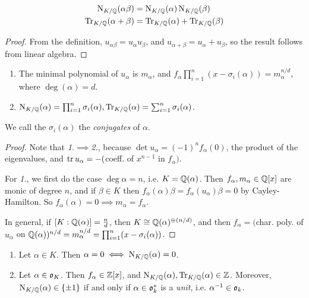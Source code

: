 \documentclass[10pt,a4paper]{article}
\begin{document}
\begin{proposition}
\begin{align*}
\operatorname{N}_{K/\mathbb{Q}}(\alpha\beta) &= \operatorname{N}_{K/\mathbb{Q}}(\alpha)\operatorname{N}_{K/\mathbb{Q}}(\beta)\\
\operatorname{Tr}_{K/\mathbb{Q}}(\alpha+\beta) &= \operatorname{Tr}_{K/\mathbb{Q}}(\alpha) + \operatorname{Tr}_{K/\mathbb{Q}}(\beta)
\end{align*}
\end{proposition}
\begin{proof}
From the definition, $u_{\alpha\beta} = u_{\alpha}u_{\beta}$, and $u_{\alpha+\beta} = u_{\alpha} + u_{\beta}$, so the result follows from linear algebra.
\end{proof}

\begin{theorem}
\item
\begin{enumerate}
\item The minimal polynomial of $u_{\alpha}$ is $m_{\alpha}$, and $f_{\alpha} \prod_{i=1}^n(x-\sigma_i(\alpha)) = m_{\alpha}^{n/d}$, where $\deg(\alpha) = d$.

\item $\operatorname{N}_{K/\mathbb{Q}}(\alpha) = \prod_{i=1}^n \sigma_i(\alpha), \operatorname{Tr}_{K/\mathbb{Q}}(\alpha) = \sum_{i=1}^n \sigma_i(\alpha)$.
\end{enumerate}
We call the $\sigma_i(\alpha)$ the \emph{conjugates} of $\alpha$.
\end{theorem}
\begin{proof}
Note that \textit{1.}$\implies$\textit{2.}, because $\det u_{\alpha} = (-1)^n f_{\alpha}(0)$, the product of the eigenvalues, and $\operatorname{tr} u_{\alpha} = -($coeff. of $ x^{n-1}$ in $f_\alpha)$.

For \textit{1.}, we first do the case $\deg \alpha = n$, i.e. $K = \mathbb{Q}(\alpha)$. Then $f_\alpha, m_\alpha \in \mathbb{Q}[x]$ are monic of degree $n$, and if $\beta \in K$ then $f_{\alpha}(\alpha)\beta = f_{\alpha}(u_{\alpha})\beta = 0$ by Cayley-Hamilton. So $f_\alpha(\alpha) = 0 \implies m_\alpha = f_\alpha$.

In general, if $[K:\mathbb{Q}(\alpha)] = \frac{n}{d}$, then $K \cong \mathbb{Q}(\alpha)^{\oplus(n/d)}$, and then $f_\alpha = ($char. poly. of $u_\alpha$ on $\mathbb{Q}(\alpha))^{n/d} = m_\alpha^{n/d} = \prod_{i=1}^n (x-\sigma_i(\alpha))$.
\end{proof}
\begin{corollary}
\item
\begin{enumerate}
\item Let $\alpha \in K$. Then $\alpha = 0 \iff \operatorname{N}_{K/\mathbb{Q}}(\alpha) = 0$.
\item Let $\alpha \in \mathfrak{o}_K$. Then $f_{\alpha} \in \mathbb{Z}[x]$, and $\operatorname{N}_{K/\mathbb{Q}}(\alpha), \operatorname{Tr}_{K/\mathbb{Q}}(\alpha) \in \mathbb{Z}$. Moreover, $\operatorname{N}_{K/\mathbb{Q}}(\alpha) \in \{\pm 1\}$ if and only if $\alpha \in \mathfrak{o}_k^{\ast}$ is a \emph{unit}, i.e. $\alpha^{-1} \in \mathfrak{o}_k$.
\end{enumerate}
\end{corollary}
\end{document}
